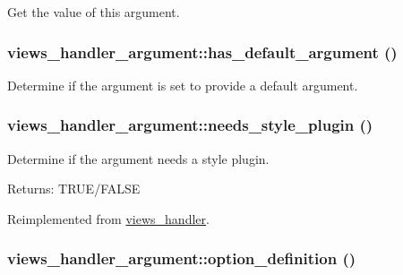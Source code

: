 Get the value of this argument. \hypertarget{classviews__handler__argument_bfc79c3b710372accd054b73bbb7b373}{
\subsubsection[{has\_\-default\_\-argument}]{\setlength{\rightskip}{0pt plus 5cm}views\_\-handler\_\-argument::has\_\-default\_\-argument ()}}
\label{classviews__handler__argument_bfc79c3b710372accd054b73bbb7b373}


Determine if the argument is set to provide a default argument. \hypertarget{classviews__handler__argument_2c09abe1e98de7438ca0701a14b00861}{
\subsubsection[{needs\_\-style\_\-plugin}]{\setlength{\rightskip}{0pt plus 5cm}views\_\-handler\_\-argument::needs\_\-style\_\-plugin ()}}
\label{classviews__handler__argument_2c09abe1e98de7438ca0701a14b00861}


Determine if the argument needs a style plugin.

\begin{Desc}
\item[Returns:]TRUE/FALSE \end{Desc}


Reimplemented from \hyperlink{classviews__handler_53baa97a6c218ce4b847c8fb4e65a350}{views\_\-handler}.\hypertarget{classviews__handler__argument_117ab20a53624e082e6e32a22d4521cc}{
\subsubsection[{option\_\-definition}]{\setlength{\rightskip}{0pt plus 5cm}views\_\-handler\_\-argument::option\_\-definition ()}}
\label{classviews__handler__argument_117ab20a53624e082e6e32a22d4521cc}



